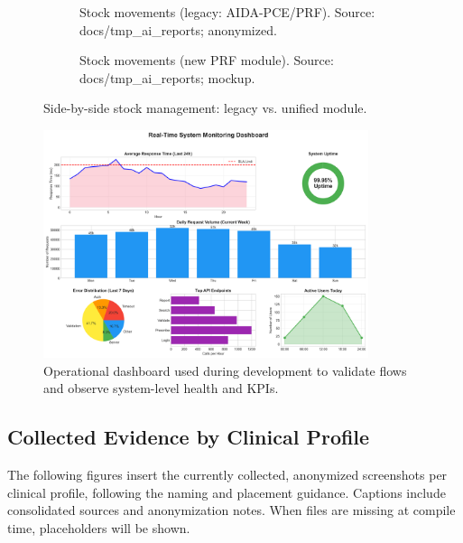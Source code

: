 \begin{figure}[htbp]
    \centering
    \begin{subfigure}[t]{0.38\textwidth}
        \centering
        \caption{Stock movements (legacy: AIDA-PCE/PRF). Source: docs/tmp\_ai\_reports; anonymized.}
        \label{fig:stock_legacy}
    \end{subfigure}
    \begin{subfigure}[t]{0.38\textwidth}
        \centering
        \caption{Stock movements (new PRF module). Source: docs/tmp\_ai\_reports; mockup.}
        \label{fig:stock_new}
    \end{subfigure}
    \caption{Side-by-side stock management: legacy vs. unified module.}
\end{figure}

\begin{figure}[htbp]
    \centering
    \includegraphics[width=0.85\textwidth]{images/generated/monitoring_dashboard.png}
    \caption{Operational dashboard used during development to validate flows and observe system-level health and KPIs.}
    \label{fig:monitoring_dashboard}
\end{figure}

\subsection{Collected Evidence by Clinical Profile}
The following figures insert the currently collected, anonymized screenshots per clinical profile, following the naming and placement guidance. Captions include consolidated sources and anonymization notes. When files are missing at compile time, placeholders will be shown.

